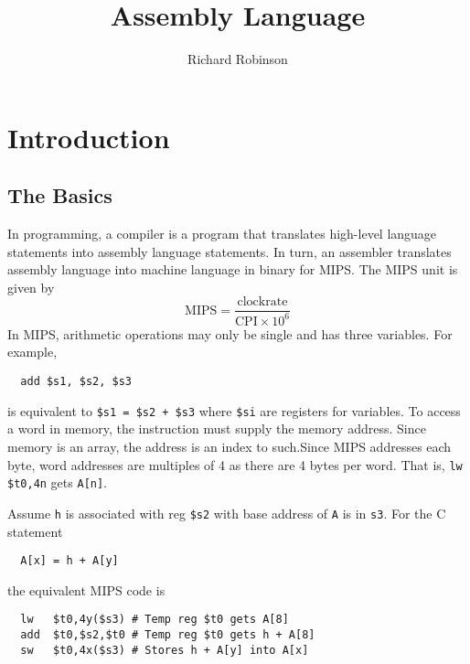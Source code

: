 \documentclass{tufte-book}
\title{Assembly Language}
\author{Richard Robinson}
\begin{document}
\frontmatter
\maketitle
\tableofcontents
\mainmatter

\setlength{\parindent}{0pt}


\chapter{Introduction}

\section{The Basics}

In programming, a compiler is a program that translates high-level language statements into assembly language statements. In turn, an assembler translates assembly language into machine language in binary for MIPS. The MIPS unit is given by
\begin{equation}
  \mathrm{MIPS} = \frac{\mathrm{clock rate}}{\mathrm{CPI} \times 10^6}
\end{equation}
In MIPS, arithmetic operations may only be single and has three variables. For example,
\begin{verbatim}
  add $s1, $s2, $s3
\end{verbatim}
is equivalent to \verb|$s1 = $s2 + $s3| where \verb|$si| are registers for variables. To access a word in memory, the instruction must supply the memory address. Since memory is an array, the address is an index to such.Since MIPS addresses each byte, word addresses are multiples of 4 as there are 4 bytes per word. That is, \verb|lw $t0,4n| gets \verb|A[n]|.

\bigskip
Assume \verb|h| is associated with reg \verb|$s2| with base address of \verb|A| is in \verb|s3|. For the C statement
\begin{verbatim}
  A[x] = h + A[y]
\end{verbatim}
the equivalent MIPS code is
\begin{verbatim}
  lw   $t0,4y($s3) # Temp reg $t0 gets A[8]
  add  $t0,$s2,$t0 # Temp reg $t0 gets h + A[8]
  sw   $t0,4x($s3) # Stores h + A[y] into A[x]
\end{verbatim}
\end{document}
